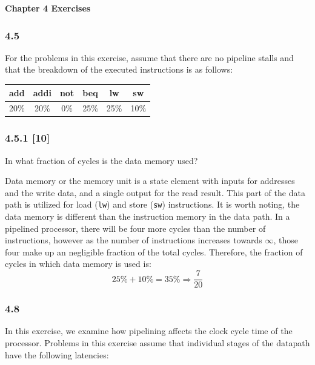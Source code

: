 \documentclass[fleqn]{article}
\begin{document}
\pagestyle{fancy}
\fancyhead{}
\fancyhead[R]{\thepage}
\fancyfoot{}

\begin{center}
    \Large{\textbf{Chapter 4 Exercises}}\\
\end{center}
\vspace{0.25in}

\subsubsection*{4.5} For the problems in this exercise, assume that there are no pipeline stalls and that the breakdown of the
executed instructions is as follows:

\begin{table}[H]
    \centering
    \begin{tabular}{|c|c|c|c|c|c|}
    \hline
    \rowcolor[HTML]{79bde8} 
    add & addi & not & beq & lw & sw \\ \hline \hline
    20\% & 20\% & 0\% & 25\% & 25\% & 10\% \\ \hline
    \end{tabular}
\end{table}


\subsubsection*{4.5.1 [10] \textrangle} In what fraction of cycles is the data memory used?
\vspace{0.125in}
\begin{addmargin}[0.15cm]{0cm}
Data memory or the memory unit is a state element with inputs for addresses and the write data, 
and a single output for the read result. This part of the data path is utilized for load 
(\verb|lw|) and store (\verb|sw|) instructions. It is worth noting, the data memory is 
different than the instruction memory in the data path. In a pipelined processor, there 
will be four more cycles than the number of instructions, however as the number of 
instructions increases towards $\infty$, those four make up an negligible fraction 
of the total cycles. Therefore, the fraction of cycles in which data memory is used is: \[25\% + 10\% = 35\% \Rightarrow \frac{7}{20}\]
\end{addmargin}


\vspace{0.125in}
\subsubsection*{4.8} In this exercise, we examine how pipelining affects the clock cycle time of the processor. Problems in
this exercise assume that individual stages of the datapath have the following latencies:
\end{document}
